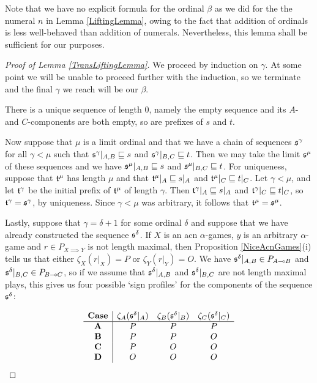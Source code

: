 \documentclass[11pt]{article} %
\begin{document}
Note that we have no explicit formula for the ordinal $\beta$ as we did for the the numeral $n$ in Lemma \ref{LiftingLemma}, owing to the fact that addition of ordinals is less well-behaved than addition of numerals.  Nevertheless, this lemma shall be sufficient for our purposes.  

\begin{proof}[Proof of Lemma \ref{TransLiftingLemma}]
  We proceed by induction on $\gamma$.  At some point we will be unable to proceed further with the induction, so we terminate and the final $\gamma$ we reach will be our $\beta$.  

  There is a unique sequence of length $0$, namely the empty sequence and its $A$- and $C$-components are both empty, so are prefixes of $s$ and $t$.  

  Now suppose that $\mu$ is a limit ordinal and that we have a chain of sequences $\mathfrak s^\gamma$ for all $\gamma<\mu$ such that $\mathfrak s^\gamma\vert_{A,B}\sqsubseteq s$ and $\mathfrak s^\gamma\vert_{B,C}\sqsubseteq t$.  Then we may take the limit $\mathfrak s^\mu$ of these sequences and we have $\mathfrak s^\mu\vert_{A,B}\sqsubseteq s$ and $\mathfrak s^\mu\vert_{B,C}\sqsubseteq t$.  For uniqueness, suppose that $\mathfrak t^\mu$ has length $\mu$ and that $\mathfrak t^\mu\vert_A\sqsubseteq s\vert_A$ and $\mathfrak t^\mu\vert_C\sqsubseteq t\vert_C$.  Let $\gamma<\mu$, and let $\mathfrak t^\gamma$ be the initial prefix of $\mathfrak t^\mu$ of length $\gamma$.  Then $\mathfrak t^\gamma\vert_A\sqsubseteq s\vert_A$ and $\mathfrak t^\gamma\vert_C\sqsubseteq t\vert_C$, so $\mathfrak t^\gamma=\mathfrak s^\gamma$, by uniqueness.  Since $\gamma<\mu$ was arbitrary, it follows that $\mathfrak t^\mu=\mathfrak s^\mu$.  

  Lastly, suppose that $\gamma=\delta+1$ for some ordinal $\delta$ and suppose that we have already constructed the sequence $\mathfrak s^\delta$.  If $X$ is an acn $\alpha$-games, $y$ is an arbitrary $\alpha$-game and $r\in P_{X\implies Y}$ is not length maximal, then Proposition \ref{NiceAcnGames}(i) tells us that either $\zeta_X(r\vert_X)=P$ or $\zeta_Y(r\vert_Y)=O$.  We have $\mathfrak s^\delta\vert_{A,B}\in P_{A\multimap B}$ and $\mathfrak s^\delta\vert_{B,C}\in P_{B\multimap C}$, so if we assume that $\mathfrak s^\delta\vert_{A,B}$ and $\mathfrak s^\delta\vert_{B,C}$ are not length maximal plays, this gives us four possible `sign profiles' for the components of the sequence $\mathfrak s^\delta$:

  \[
    \begin{array}{c|ccc}
      \textbf{Case} & \zeta_A(\mathfrak s^\delta\vert_A) & \zeta_B(\mathfrak s^\delta\vert_B) & \zeta_C(\mathfrak s^\delta\vert_C) \\
      \hline
      \textbf{A} & P & P & P \\
      \textbf{B} & P & P & O \\
      \textbf{C} & P & O & O \\
      \textbf{D} & O & O & O
    \end{array}
    \]


\end{proof}
\end{document}

